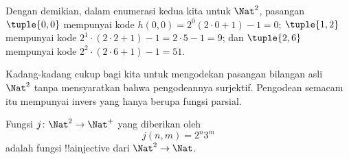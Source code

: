 \documentclass[../../../include/open-logic-section]{subfiles}
\begin{document}
\begin{explain}
Dengan demikian, dalam enumerasi kedua kita untuk $\Nat^2$, pasangan
$\tuple{0,0}$ mempunyai kode $h(0,0) = 2^0(2\cdot 0+1) - 1 = 0$;
$\tuple{1,2}$ mempunyai kode $2^{1} \cdot (2 \cdot 2 + 1) - 1 = 2
\cdot 5 - 1 = 9$; dan $\tuple{2,6}$ mempunyai kode $2^{2} \cdot (2
\cdot 6 + 1) - 1 = 51$.
\end{explain}

Kadang-kadang cukup bagi kita untuk mengodekan pasangan bilangan
asli~$\Nat^2$ tanpa mensyaratkan bahwa pengodeannya surjektif. Pengodean
semacam itu mempunyai invers yang hanya berupa fungsi parsial.

\begin{ex}
Fungsi $j\colon \Nat^2 \to \Nat^+$ yang diberikan oleh
\[
j(n,m) = 2^n3^m
\]
adalah fungsi !!a{injective} dari $\Nat^2 \to \Nat$.
\end{ex}
\end{document}
